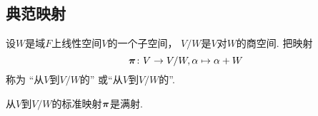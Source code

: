 \subsection{典范映射}
\begin{definition}
设\(W\)是域\(F\)上线性空间\(V\)的一个子空间，
\(V/W\)是\(V\)对\(W\)的商空间.
把映射\begin{equation*}
	\boldsymbol\pi\colon V \to V/W,
	\alpha \mapsto \alpha+W
\end{equation*}称为
“从\(V\)到\(V/W\)的”
或“从\(V\)到\(V/W\)的”.
\end{definition}

\begin{proposition}
从\(V\)到\(V/W\)的标准映射\(\boldsymbol\pi\)是满射.
\end{proposition}

